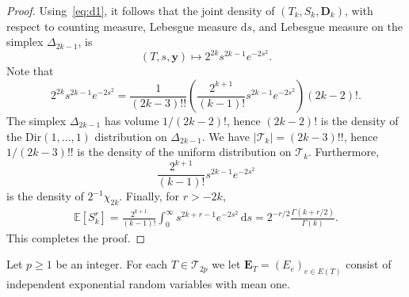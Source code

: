 \documentclass[english,11pt]{smfart}
\newcommand{\Ex}[1]{\mathbb{E}[#1]}
\newcommand{\cT}{\mathcal{T}}
\numberwithin{equation}{section}
\begin{document}
\begin{proof}
	Using~\eqref{eq:d1}, it follows that the joint density of
	$(T_k,S_k,\bm D_k)$, with respect to counting measure, Lebesgue measure
	$\mathrm{d}s$, and Lebesgue measure on the  simplex $\Delta_{2k-1}$, is
	\[
		(T, s, \bm{y}) \mapsto 2^{2k}s^{2k-1}e^{-2s^2}.
	\]
	Note that
	\[
		2^{2k}s^{2k-1}e^{-2s^2}	= \frac{1}{(2k-3)!!}\left( \frac{2^{k+1}}{(k-1)!}s^{2k-1}e^{-2s^2} \right) (2k-2)!.
	\]
	The simplex $\Delta_{2k-1}$ has volume $1/(2k-2)!$, hence $(2k-2)!$ is the density of the $\mathrm{Dir}(1,\ldots,1)$ distribution on $\Delta_{2k-1}$. We have $|\cT_k| = (2k-3)!!$, hence $1/(2k-3)!!$ is the density of the uniform distribution on $\cT_k$. Furthermore,
	\[
		\frac{2^{k+1}}{(k-1)!}s^{2k-1}e^{-2s^2} 
	\]
	is the density of $2^{-1}\chi_{2k}$. Finally, for $r>-2k$,
	\begin{align*}
		\Ex{S_k^r} = \frac{2^{k+1}}{(k-1)!} \int_0^\infty s^{2k+r-1}e^{-2s^2}\,\mathrm{d}s
		= 2^{-r/2}\frac{\Gamma(k+r/2)}{\Gamma(k)}.
	\end{align*}
	This completes the proof.
\end{proof}

Let $p \ge 1$ be an integer. For each $T \in \cT_{2p}$ we let $\bm{E}_T=(E_e)_{e \in E(T)}$ consist of independent exponential random variables with mean one.
\end{document}
